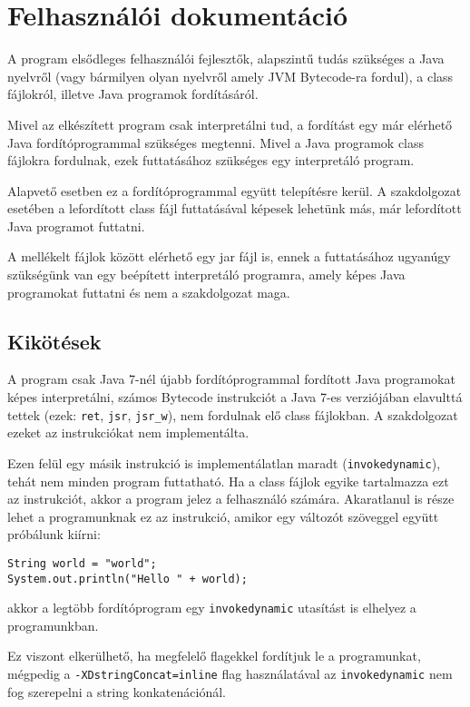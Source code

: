 \chapter{Felhasználói dokumentáció}
\label{ch:user}

A program elsődleges felhasználói fejlesztők, alapszintű tudás szükséges a Java nyelvről (vagy bármilyen olyan nyelvről amely JVM Bytecode-ra fordul), a class fájlokról, illetve Java programok fordításáról.

Mivel az elkészített program csak interpretálni tud, a fordítást egy már elérhető Java fordítóprogrammal szükséges megtenni. Mivel a Java programok class fájlokra fordulnak, ezek futtatásához szükséges egy interpretáló program.

Alapvető esetben ez a fordítóprogrammal együtt telepítésre kerül. A szakdolgozat esetében a lefordított class fájl futtatásával képesek lehetünk más, már lefordított Java programot futtatni.

A mellékelt fájlok között elérhető egy jar fájl is, ennek a futtatásához ugyanúgy szükségünk van egy beépített interpretáló programra, amely képes Java programokat futtatni és nem a szakdolgozat maga.

\section{Kikötések}
A program csak Java 7-nél újabb fordítóprogrammal fordított Java programokat képes interpretálni, számos Bytecode instrukciót a Java 7-es verziójában elavulttá tettek (ezek: \lstinline{ret}, \lstinline{jsr}, \lstinline{jsr_w}), nem fordulnak elő class fájlokban. A szakdolgozat ezeket az instrukciókat nem implementálta.

Ezen felül egy másik instrukció is implementálatlan maradt (\lstinline{invokedynamic}), tehát nem minden program futtatható. Ha a class fájlok egyike tartalmazza ezt az instrukciót, akkor a program jelez a felhasználó számára. Akaratlanul is része lehet a programunknak ez az instrukció, amikor egy változót szöveggel együtt próbálunk kiírni:
\begin{verbatim}
String world = "world";
System.out.println("Hello " + world);
\end{verbatim}
akkor a legtöbb fordítóprogram egy \lstinline{invokedynamic} utasítást is elhelyez a programunkban.

Ez viszont elkerülhető, ha megfelelő flagekkel fordítjuk le a programunkat, mégpedig a \lstinline{-XDstringConcat=inline} flag használatával az \lstinline{invokedynamic} nem fog szerepelni a string konkatenációnál.

